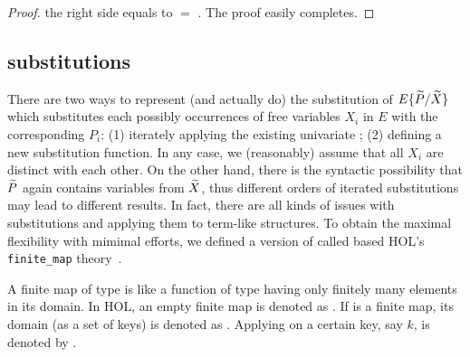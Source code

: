 \begin{proof}
    the right side equals to  $=$
    . The proof easily completes.
\end{proof}

\subsection{\Multivariate substitutions}

There are two ways to represent (and actually do) the \multivariate
substitution of $E\{\widetilde P/\widetilde X\}$ which substitutes each possibly
occurrences of free variables $X_i$ in $E$ with the corresponding
$P_i$: (1) iterately applying the existing univariate
; (2) defining a new \multivariate substitution
function. In any case, we (reasonably) assume that all $X_i$ are
distinct with each other. On the other hand, there is the syntactic
possibility that $\widetilde P$ again contains variables from $\widetilde X$, thus
different orders of iterated substitutions may lead to different results.
In fact, there are all kinds of issues with
substitutions and applying them to term-like structures. To obtain the
maximal flexibility with mimimal efforts, we defined
a \multivariate version of 
called  based HOL's \texttt{finite\_map} theory~\cite{holdesc}.

A finite map of type \HOLinline{\ensuremath{\alpha} \HOLTokenMapto{} \ensuremath{\beta}} is like a function of type
\HOLinline{\ensuremath{\alpha} \HOLTokenTransEnd \ensuremath{\beta}} having only finitely many elements in its
domain. In HOL, an empty finite map is denoted as .
If  is a finite map, its domain (as a set of keys) is denoted as
. Applying  on a certain key, say $k$, is denoted
by .


